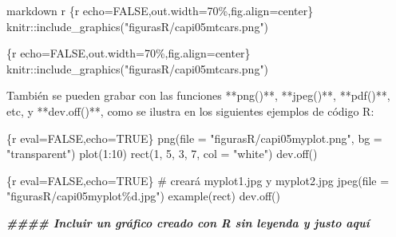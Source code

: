 \documentclass[11pt,a4paper,oneside,]{article}
\newenvironment{Shaded}{\begin{snugshade}}{\end{snugshade}}
\newcommand{\AttributeTok}[1]{\textcolor[rgb]{0.77,0.63,0.00}{#1}}
\newcommand{\DocumentationTok}[1]{\textcolor[rgb]{0.56,0.35,0.01}{\textbf{\textit{#1}}}}
\newcommand{\NormalTok}[1]{#1}
\newcommand{\SpecialCharTok}[1]{\textcolor[rgb]{0.00,0.00,0.00}{#1}}
\newcommand{\StringTok}[1]{\textcolor[rgb]{0.31,0.60,0.02}{#1}}
\numberwithin{dummy}{section}
\theoremstyle{ocrenumbox}
\theoremstyle{blacknumex}
\theoremstyle{blacknumbox}
\theoremstyle{ocrenum}
\theoremstyle{ocrenum}
\begin{document}
\begin{Shaded}
\begin{Highlighting}[numbers=left,,]
\StringTok{\textasciigrave{}\textasciigrave{}\textasciigrave{}\textasciigrave{}}\NormalTok{markdown}
\StringTok{\textasciigrave{}}\AttributeTok{r \textquotesingle{}\textquotesingle{}}\StringTok{\textasciigrave{}\textasciigrave{}\textasciigrave{}\textasciigrave{}}\AttributeTok{\{r echo=FALSE,out.width=\textquotesingle{}70\%\textquotesingle{},fig.align=\textquotesingle{}center\textquotesingle{}\}}
\AttributeTok{knitr::include\_graphics("figurasR/capi05mtcars.png")}
\StringTok{\textasciigrave{}\textasciigrave{}\textasciigrave{}}
\StringTok{\textasciigrave{}\textasciigrave{}\textasciigrave{}\textasciigrave{}}

\StringTok{\textasciigrave{}\textasciigrave{}\textasciigrave{}}\AttributeTok{\{r echo=FALSE,out.width=\textquotesingle{}70\%\textquotesingle{},fig.align=\textquotesingle{}center\textquotesingle{}\}}
\AttributeTok{knitr::include\_graphics("figurasR/capi05mtcars.png")}
\StringTok{\textasciigrave{}\textasciigrave{}\textasciigrave{}}

\NormalTok{También se pueden grabar con las funciones }\SpecialCharTok{**}\StringTok{\textasciigrave{}}\AttributeTok{png()}\StringTok{\textasciigrave{}}\SpecialCharTok{**}\NormalTok{, }\SpecialCharTok{**}\StringTok{\textasciigrave{}}\AttributeTok{jpeg()}\StringTok{\textasciigrave{}}\SpecialCharTok{**}\NormalTok{, }\SpecialCharTok{**}\StringTok{\textasciigrave{}}\AttributeTok{pdf()}\StringTok{\textasciigrave{}}\SpecialCharTok{**}\NormalTok{, etc, y }\SpecialCharTok{**}\StringTok{\textasciigrave{}}\AttributeTok{dev.off()}\StringTok{\textasciigrave{}}\SpecialCharTok{**}\NormalTok{, como se ilustra en los siguientes ejemplos de código R}\SpecialCharTok{:}

\StringTok{\textasciigrave{}\textasciigrave{}\textasciigrave{}}\AttributeTok{\{r eval=FALSE,echo=TRUE\}}
\AttributeTok{png(file = "figurasR/capi05myplot.png", bg = "transparent")}
\AttributeTok{plot(1:10)}
\AttributeTok{rect(1, 5, 3, 7, col = "white")}
\AttributeTok{dev.off()}
\StringTok{\textasciigrave{}\textasciigrave{}\textasciigrave{}}

\StringTok{\textasciigrave{}\textasciigrave{}\textasciigrave{}}\AttributeTok{\{r eval=FALSE,echo=TRUE\}}
\AttributeTok{ \# creará myplot1.jpg y myplot2.jpg}
\AttributeTok{jpeg(file = "figurasR/capi05myplot\%d.jpg")}
\AttributeTok{example(rect)}
\AttributeTok{dev.off()}
\StringTok{\textasciigrave{}\textasciigrave{}\textasciigrave{}}


\DocumentationTok{\#\#\#\# Incluir un gráfico creado con R sin leyenda y justo aquí}


\end{Highlighting}
\end{Shaded}
\end{document}
